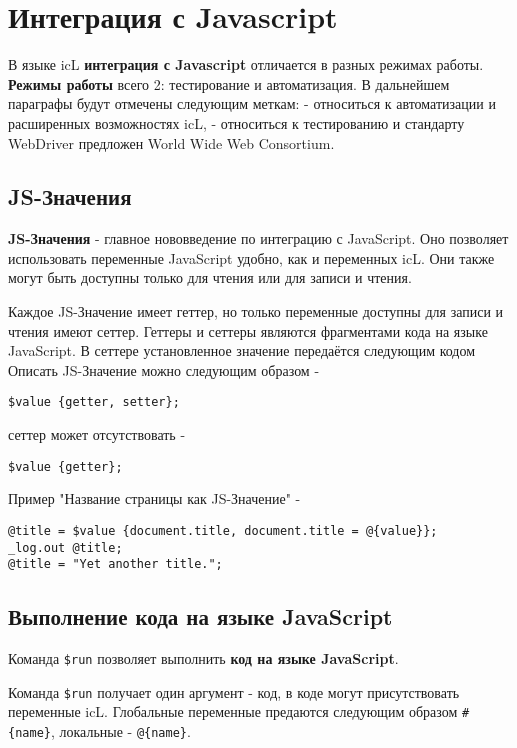 \documentclass[a4paper, 14pt]{extarticle}
\begin{document}
\newpage
\section{Интеграция с Javascript}

В языке icL {\bf интеграция с Javascript} отличается в разных режимах работы. {\bf Режимы работы} всего 2: тестирование и автоматизация. В дальнейшем параграфы будут отмечены следующим меткам: \code{[icL]} - относиться к автоматизации и расширенных возможностях icL, \code{[w3c]} - относиться к тестированию и стандарту WebDriver предложен World Wide Web Consortium.

\subsection{JS-Значения}

{\bf JS-Значения} - главное нововведение по интеграцию с JavaScript. Оно позволяет использовать переменные JavaScript удобно, как и переменных icL. Они также могут быть доступны только для чтения или для записи и чтения.

Каждое JS-Значение имеет геттер, но только переменные доступны для записи и чтения имеют сеттер. Геттеры и сеттеры являются фрагментами кода на языке JavaScript. В сеттере установленное значение передаётся следующим кодом  Описать JS-Значение можно следующим образом -
\begin{lstlisting}[numbers=none]
$value {getter, setter};
\end{lstlisting}
сеттер может отсутствовать -
\begin{lstlisting}[numbers=none]
$value {getter};
\end{lstlisting}

\noindent Пример "Название страницы как JS-Значение" -
\begin{lstlisting}[numbers=none]
@title = $value {document.title, document.title = @{value}};
_log.out @title;
@title = "Yet another title.";
\end{lstlisting}

\subsection{Выполнение кода на языке JavaScript}

Команда \lstinline|$run| позволяет выполнить {\bf код на языке JavaScript}.

\code{[icL]} Команда \lstinline|$run| получает один аргумент - код, в коде могут присутствовать переменные icL. Глобальные переменные предаются следующим образом \lstinline|#{name}|, локальные - \lstinline|@{name}|.
\end{document}
